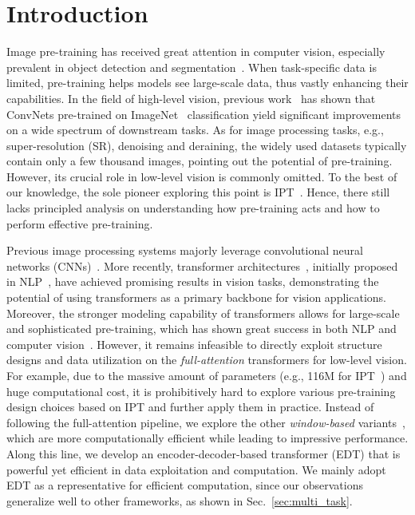 \documentclass[runningheads]{llncs}
\makeatletter
\newcommand*{\eg}{e.g.\@\xspace}
\makeatother
\begin{document}
\section{Introduction}
	\label{sec:intro}
	
	Image pre-training has received great attention in computer vision, especially prevalent in object detection and segmentation~\cite{girshick2014rich,girshick2015fast,donahue2014decaf,long2015fully,chen2017deeplab}. When task-specific data is limited, pre-training helps models see large-scale data, thus vastly enhancing their capabilities. In the field of high-level vision, previous work~\cite{sharif2014cnn,kornblith2019better,mahajan2018exploring,sun2017revisiting,kolesnikov2020big} has shown that ConvNets pre-trained on ImageNet~\cite{deng2009imagenet} classification yield significant improvements on a wide spectrum of downstream tasks. As for image processing tasks, \eg, super-resolution (SR), denoising and deraining, the widely used datasets typically contain only a few thousand images, pointing out the potential of pre-training. However, its crucial role in low-level vision is commonly omitted. To the best of our knowledge, the sole pioneer exploring this point is IPT~\cite{chen2021pre}. Hence, there still lacks principled analysis on understanding how pre-training acts and how to perform effective pre-training. 
	


	Previous image processing systems majorly leverage convolutional neural networks (CNNs)~\cite{lecun1989backpropagation}. More recently, transformer architectures~\cite{dosovitskiy2020image,carion2020end,liu2021Swin,wang2021pyramid,strudel2021segmenter,zhang2021multi}, initially proposed in NLP~\cite{vaswani2017attention}, have achieved promising results in vision tasks, demonstrating the potential of using transformers as a primary backbone for vision applications. Moreover, the stronger modeling capability of transformers allows for large-scale and sophisticated pre-training, which has shown great success in both NLP and computer vision~\cite{radford2018improving,radford2019language,brown2020language,devlin2018bert,raffel2020exploring,chen2021pre,he2021masked,bao2021beit,xie2021simmim}. However, it remains infeasible to directly exploit structure designs and data utilization on the \textit{full-attention} transformers for low-level vision. For example, due to the massive amount of parameters (e.g., 116M for IPT~\cite{chen2021pre}) and huge computational cost, it is prohibitively hard to explore various pre-training design choices based on IPT and further apply them in practice. Instead of following the full-attention pipeline, we explore the other \textit{window-based} variants~\cite{liang2021swinir,wang2021uformer}, which are more computationally efficient while leading to impressive performance. Along this line, we develop an encoder-decoder-based transformer (EDT) that is powerful yet efficient in data exploitation and computation. We mainly adopt EDT as a representative for efficient computation, since our observations generalize well to other frameworks, as shown in Sec.~\ref{sec:multi_task}. 
	
\end{document}

